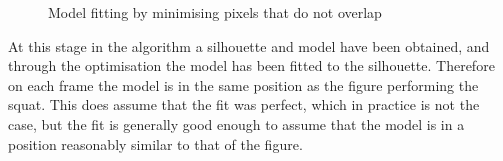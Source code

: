 \begin{figure}[H]
    \centering
\caption{Model fitting by minimising pixels that do not overlap}
\label{fig:modeloverlap}
\end{figure}

At this stage in the algorithm a silhouette and model have been obtained, and through the optimisation the model has been fitted to the silhouette. Therefore on each frame the model is in the same position as the figure performing the squat. This does assume that the fit was perfect, which in practice is not the case, but the fit is generally good enough to assume that the model is in a position reasonably similar to that of the figure.
